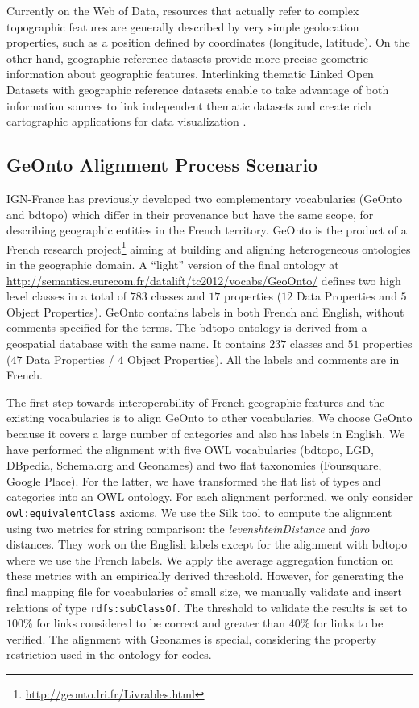 Currently on the Web of Data, resources that actually refer to complex topographic features are generally described by very simple geolocation properties, such as a position defined by coordinates (longitude, latitude). On the other hand, geographic reference datasets provide more precise geometric information about geographic features. Interlinking thematic Linked Open Datasets with geographic reference datasets enable to take advantage of both information sources to link independent thematic datasets and create rich cartographic applications for data visualization \cite{feliachi2013}.

\subsection{GeOnto Alignment Process Scenario}
 \label{sec:vocabalignment}
IGN-France has previously developed two complementary vocabularies (GeOnto and bdtopo) which differ in their provenance but have the same scope, for describing geographic entities in the French territory. GeOnto is the product of a French research project\footnote{\url{http://geonto.lri.fr/Livrables.html}} aiming at building and aligning heterogeneous ontologies in the geographic domain. A ``light'' version of the final ontology at \url{http://semantics.eurecom.fr/datalift/tc2012/vocabs/GeoOnto/} defines two high level classes in a total of $783$ classes and $17$ properties ($12$ Data Properties and $5$ Object Properties). GeOnto contains labels in both French and English, without comments specified for the terms. The bdtopo ontology is derived from a geospatial database with the same name. It contains $237$ classes and $51$ properties ($47$ Data Properties / $4$ Object Properties). All the labels and comments are in French.

The first step towards interoperability of French geographic features and the existing vocabularies is to align GeOnto to other vocabularies. We choose GeOnto because it covers a large number of categories and also has labels in English. We have performed the alignment with five OWL vocabularies (bdtopo, LGD, DBpedia, Schema.org and Geonames) and two flat taxonomies (Foursquare, Google Place). For the latter, we have transformed the flat list of types and categories into an OWL ontology. For each alignment performed, we only consider \texttt{owl:equivalentClass} axioms. We use the Silk tool \cite{Julius09} to compute the alignment using two metrics for string comparison: the \textit{levenshteinDistance} and \textit{jaro} distances. They work on the English labels except for the alignment with bdtopo where we use the French labels. We apply the average aggregation function on these metrics with an empirically derived threshold. However, for generating the final mapping file for vocabularies of small size, we manually validate and insert relations of type \texttt{rdfs:subClassOf}. The threshold to validate the results is set to $100$\% for links considered to be correct and greater than $40$\% for links to be verified. The alignment with Geonames is special, considering the property restriction used in the ontology for codes.

